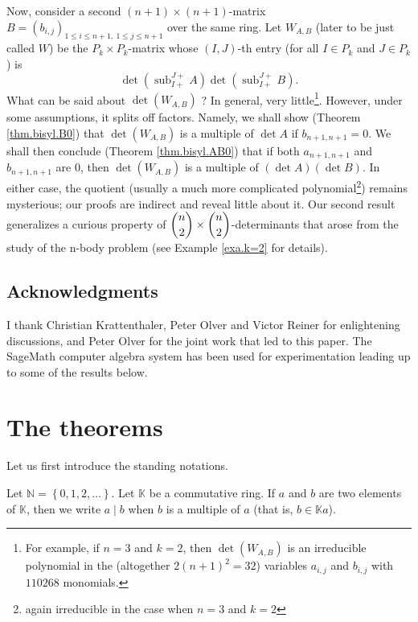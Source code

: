 \documentclass[numbers=enddot,12pt,final,onecolumn,notitlepage]{scrartcl}%
\theoremstyle{definition}
\begin{document}
Now, consider a second $\left(  n+1\right)  \times\left(  n+1\right)  $-matrix
$B=\left(  b_{i,j}\right)  _{1\leq i\leq n+1,\ 1\leq j\leq n+1}$ over the same
ring. Let $W_{A,B}$ (later to be just called $W$) be the $P_{k}\times P_{k}%
$-matrix whose $\left(  I,J\right)  $-th entry (for all $I\in P_{k}$ and $J\in
P_{k}$) is
\[
\det\left(  \operatorname*{sub}\nolimits_{I+}^{J+}A\right)  \det\left(
\operatorname*{sub}\nolimits_{I+}^{J+}B\right)  .
\]
What can be said about $\det\left(  W_{A,B}\right)  $ ? In general, very
little\footnote{For example, if $n=3$ and $k=2$, then $\det\left(
W_{A,B}\right)  $ is an irreducible polynomial in the (altogether $2\left(
n+1\right)  ^{2}=32$) variables $a_{i,j}$ and $b_{i,j}$ with $110268$
monomials.}. However, under some assumptions, it splits off factors. Namely,
we shall show (Theorem \ref{thm.bisyl.B0}) that $\det\left(  W_{A,B}\right)  $
is a multiple of $\det A$ if $b_{n+1,n+1}=0$. We shall then conclude (Theorem
\ref{thm.bisyl.AB0}) that if both $a_{n+1,n+1}$ and $b_{n+1,n+1}$ are $0$,
then $\det\left(  W_{A,B}\right)  $ is a multiple of $\left(  \det A\right)
\left(  \det B\right)  $. In either case, the quotient (usually a much more
complicated polynomial\footnote{again irreducible in the case when $n=3$ and
$k=2$}) remains mysterious; our proofs are indirect and reveal little about
it. Our second result generalizes a curious property of $\dbinom{n}{2}%
\times\dbinom{n}{2}$-determinants \cite[Theorem 10]{GriOlv18} that arose from
the study of the n-body problem (see Example \ref{exa.k=2} for details).

\subsection*{Acknowledgments}

I thank Christian Krattenthaler, Peter Olver and Victor Reiner for
enlightening discussions, and Peter Olver for the joint work that led to this
paper. The SageMath computer algebra system \cite{SageMath} has been used for
experimentation leading up to some of the results below.

\section{The theorems}

Let us first introduce the standing notations.

Let $\mathbb{N}=\left\{  0,1,2,\ldots\right\}  $. Let $\mathbb{K}$ be a
commutative ring. If $a$ and $b$ are two elements of $\mathbb{K}$, then we
write $a\mid b$ when $b$ is a multiple of $a$ (that is, $b\in\mathbb{K}a$).
\end{document}

